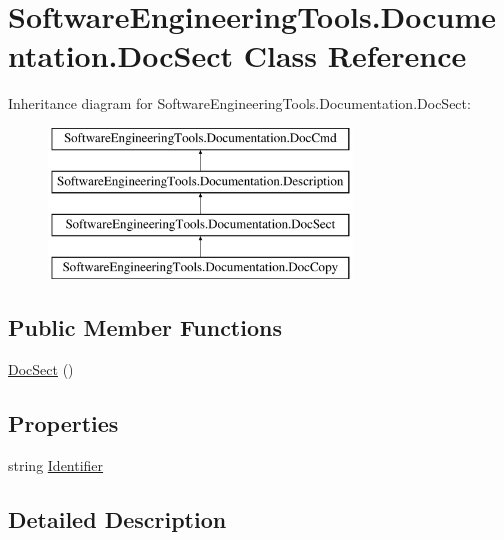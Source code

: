 \hypertarget{class_software_engineering_tools_1_1_documentation_1_1_doc_sect}{\section{Software\+Engineering\+Tools.\+Documentation.\+Doc\+Sect Class Reference}
\label{class_software_engineering_tools_1_1_documentation_1_1_doc_sect}
}
Inheritance diagram for Software\+Engineering\+Tools.\+Documentation.\+Doc\+Sect\+:\begin{figure}[H]
\begin{center}
\leavevmode
\includegraphics[height=4.000000cm]{class_software_engineering_tools_1_1_documentation_1_1_doc_sect}
\end{center}
\end{figure}
\subsection*{Public Member Functions}
\begin{DoxyCompactItemize}
\item 
\hyperlink{class_software_engineering_tools_1_1_documentation_1_1_doc_sect_adce39a3ebfcb0efa91ee3995bd1d022f}{Doc\+Sect} ()
\end{DoxyCompactItemize}
\subsection*{Properties}
\begin{DoxyCompactItemize}
\item 
string \hyperlink{class_software_engineering_tools_1_1_documentation_1_1_doc_sect_af51ffb6e3c0c2d2bad7cfdf4f04895a9}{Identifier}
\end{DoxyCompactItemize}


\subsection{Detailed Description}


